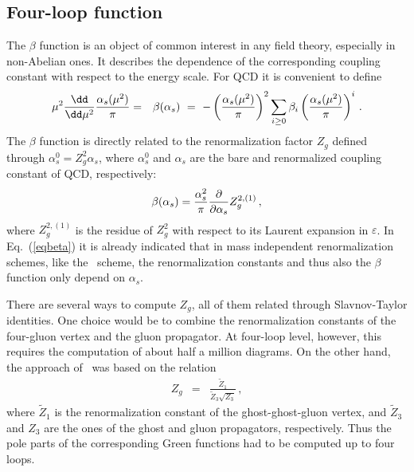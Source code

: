 %
\subsection[Four-loop $\beta$ function]{Four-loop \bld{\beta} 
  function\label{sec::beta}}
%
%
The $\beta$ function is an object of common interest in any field
theory, especially in non-Abelian ones. It describes the dependence of
the corresponding coupling constant with respect to the energy scale.
For QCD it is convenient to define
\begin{eqnarray}
\mu^2{\dd\over \dd\mu^2}\frac{\alpha_s(\mu^2)}{\pi} &=& 
\beta(\alpha_s)
\,\,=\,\,
-\left(\frac{\alpha_s(\mu^2)}{\pi}\right)^2
\sum_{i\ge0}\beta_i\left(\frac{\alpha_s(\mu^2)}{\pi}\right)^i
\,.
\end{eqnarray}
The $\beta$ function is directly related to the renormalization factor
$Z_g$ defined through $\alpha_s^0
= Z_g^2\alpha_s $, where $\alpha_s^0$ and $\alpha_s$ are
the bare and renormalized coupling constant of QCD, respectively:
\begin{eqnarray}
  \beta(\alpha_s)= {\alpha_s^2\over \pi}
  {\partial\over \partial\alpha_s} Z_g^{2,(1)}\,,
\label{eqbeta}
\end{eqnarray}
where $Z_g^{2,(1)}$ is the residue of $Z_g^2$ with respect to its
Laurent expansion in $\varepsilon$.
In Eq.~(\ref{eqbeta}) it is already indicated that in mass independent
renormalization schemes, like the \msbar\ scheme, the renormalization
constants and thus also the $\beta$ function only depend on $\alpha_s$.

There are several ways to compute $Z_g$, all of them related through
Slavnov-Taylor identities.  One choice would be to combine the
renormalization constants of the four-gluon vertex and the gluon
propagator.  At four-loop level, however, this requires the computation
of about half a million diagrams.  On the other hand, the approach
of~\cite{RitVerLar97} was based on the relation
\begin{eqnarray}
Z_g &=& \frac{\tilde{Z}_1}{\tilde{Z}_3\sqrt{Z_3}}
\,,
\end{eqnarray}
where $\tilde{Z}_1$ is the renormalization constant of the
ghost-ghost-gluon vertex, and $\tilde{Z}_3$ and $Z_3$ are the ones of
the ghost and gluon propagators, respectively.  Thus the pole parts of
the corresponding Green functions had to be computed up to four loops.

